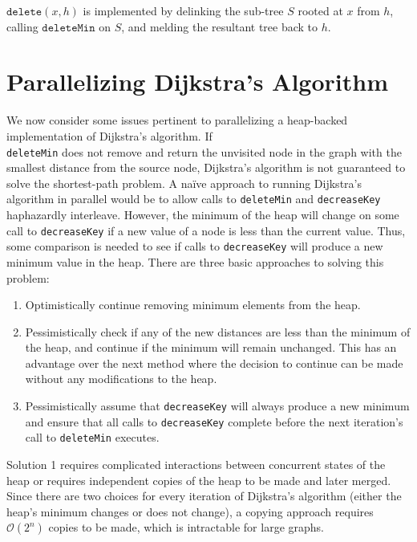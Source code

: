 \documentclass{acm_proc_article-sp}
\begin{document}
$\mathtt{delete}(x,h)$ is implemented by delinking the sub-tree $S$ rooted at $x$ from $h$, calling $\mathtt{deleteMin}$ on $S$, and melding the resultant
tree back to $h$.


\section{Parallelizing Dijkstra's Algorithm}
\label{sec:dijkstra}
We now consider some issues pertinent to parallelizing a heap-backed
implementation of Dijkstra's algorithm. If \\ \texttt{deleteMin} does not
remove and return the unvisited node in the graph with the smallest distance
from the source node, Dijkstra's algorithm is not guaranteed to solve the shortest-path problem.
A na\"{i}ve approach to running Dijkstra's algorithm in parallel would be to allow calls
to \texttt{deleteMin} and \texttt{decreaseKey} haphazardly interleave. However,
the minimum of the heap will change on some call to \texttt{decreaseKey} if
a new value of a node is less than the current value. Thus, some comparison
is needed to see if calls to \texttt{decreaseKey} will produce a new minimum
value in the heap. There are three basic approaches to solving this problem:

\begin{enumerate}
  \item Optimistically continue removing minimum elements from the heap. 
  \item Pessimistically check if any of the new distances are less than the minimum of the heap, and continue
    if the minimum will remain unchanged. This has an advantage over the next method where the decision to continue
    can be made without any modifications to the heap.
  \item Pessimistically assume that \texttt{decreaseKey} will always produce a new minimum and ensure that
    all calls to \texttt{decreaseKey} complete before the next iteration's call to \texttt{deleteMin} executes.
\end{enumerate}

Solution 1 requires complicated interactions between concurrent states of the heap
or requires independent copies of the heap to be made and later merged. Since there are
two choices for every iteration of Dijkstra's algorithm (either the heap's minimum changes
or does not change), a copying approach requires $\mathcal{O}(2^n)$ copies to be made, which is
intractable for large graphs.
\end{document}
